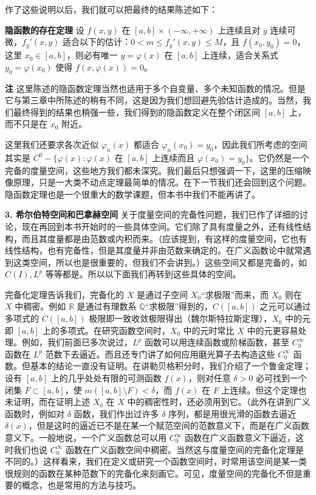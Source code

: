 作了这些说明以后，我们就可以把最终的结果陈述如下：

\noindent\textbf{隐函数的存在定理}\quad
设 $f(x,y)$ 在 $[a,b]\times(-\infty,+\infty)$ 上连续且对 $y$ 连续可微，$f_y'(x,y)$ 适合以下的估计：$0<m\le f_y'(x,y)\le M$，且 $f(x_0,y_0)=0$，这里 $x_0\in[a,b]$，则必有唯一 $y=\varphi(x)$ 在 $[a,b]$ 上连续，适合关系式 $y_0=\varphi(x_0)$ 使得 $f(x,\varphi(x))=0$。

\noindent\textbf{注}\quad
这里陈述的隐函数定理当然也适用于多个自变量、多个未知函数的情况。但是它与第三章中所陈述的稍有不同，这是因为我们想回避先验估计造成的。当然，我们最终得到的结果也稍强一些，我们得到的隐函数定义在整个闭区间 $[a,b]$ 上，而不只是在 $x_0$ 附近。

这里我们还要求各次近似 $\varphi_n(x)$ 都适合 $\varphi_n(x_0)=y_0$，因此我们所考虑的空间其实是 $C^0-\{\varphi(x):\varphi(x)\text{ 在 }[a,b]\text{ 上连续而且 }\varphi(x_0)=y_0\}$。它仍然是一个完备的度量空间，这些地方我们都未深究。我们最后只想强调一下，这里的压缩映像原理，只是一大类不动点定理最简单的情况。在下一节我们还会回到这个问题。隐函数定理也是一个很重大的数学课题，但本书中我们不能再讲了。

\noindent\textbf{3. 希尔伯特空间和巴拿赫空间}\quad
关于度量空间的完备性问题，我们已作了详细的讨论，现在再回到本书开始时的一些具体空间。它们除了具有度量之外，还有线性结构，而且其度量都是由范数或内积而来。（应该提到，有这样的度量空间，它也有线性结构，也有完备性，但是其度量并非由范数来确定的。在广义函数论中就常遇到这类空间，所以也是很重要的，但我们不会讲到。）这些空间又都是完备的，如 $C(I),L^p$ 等等都是。所以以下面我们再转到这些具体的空间。

完备化定理告诉我们，完备化的 $X$ 是通过子空间 $X_0$“求极限”而来，而 $X_0$ 则在 $X$ 中稠密。例如 $\mathbb R$ 是通过有理数系 $\mathbb Q$“求极限”得到的，$C([a,b])$ 之元可以通过多项式的 $C([a,b])$ 极限即一致收敛极限得出（魏尔斯特拉斯定理），$X_0$ 中的元即 $[a,b]$ 上的多项式。在研究函数空间时，$X_0$ 中的元时常比 $X$ 中的元更容易处理。例如，我们前面已多次说过，$L^p$ 函数可以用连续函数或阶梯函数，甚至 $C_0^\infty$ 函数在 $L^p$ 范数下去逼近。而且还专门讲了如何应用磨光算子去构造这些 $C_0^\infty$ 函数。但基本的结论一直没有证明。在讲勒贝格积分时，我们介绍了一个鲁金定理；设有 $[a,b]$ 上的几乎处处有限的可测函数 $f(x)$，则对任意 $\delta>0$ 必可找到一个闭集 $F\subset[a,b]$，使 $m([a,b]\setminus F)<\delta$，而 $f(x)$ 在 $F$ 上连续。但这个定理也未证明，而在证明上述 $X_0$ 在 $X$ 中的稠密性时，还必须用到它。（此外在讲到广义函数时，例如对 $\delta$ 函数，我们作出过许多 $\delta$ 序列，都是用很光滑的函数去逼近 $\delta(x)$，但是这时的逼近已不是在某一个赋范空间的范数意义下，而是在广义函数意义下。一般地说，一个广义函数总可以用 $C_0^\infty$ 函数在广义函数意义下逼近，这时我们也说 $C_0^\infty$ 函数在广义函数空间中稠密。当然这与度量空间的完备化定理是不同的。）这样看来，我们在定义或研究一个函数空间时，时常用该空间是某一类很规则的函数在某种范数下的完备化来刻画它。可见，度量空间的完备化不但是重要的概念，也是常用的方法与技巧。

